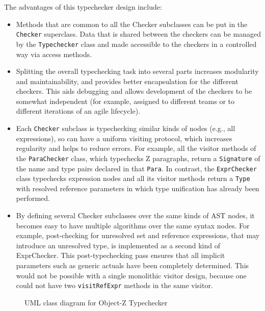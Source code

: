 \documentclass{llncs}
\begin{document}
The advantages of this typechecker design include:
\begin{itemize}

\item Methods that are common to all the Checker subclasses can be put in
  the \texttt{Checker} superclass.  Data that is shared between the checkers
  can be managed by the \texttt{Typechecker} class and made accessible
  to the checkers in a controlled way via access methods.

\item Splitting the overall typechecking task into several parts increases
  modularity and maintainability, and provides better encapsulation
  for the different checkers.  This aids debugging and allows development
  of the checkers to be somewhat independent (for example, assigned to
  different teams or to different iterations of an agile lifecycle).

\item Each \texttt{Checker} subclass is typechecking similar kinds of
  nodes (e.g., all expressions), so can have a uniform visiting
  protocol, which increases regularity and helps to reduce errors.
  For example, all the visitor methods of the
  \texttt{ParaChecker} class, which typechecks Z paragraphs, return a
  \texttt{Signature} of the name and type pairs declared in that
  \texttt{Para}.  In contrast, the \texttt{ExprChecker} class
  typechecks expression nodes and all its visitor methods return a
  \texttt{Type} with resolved reference parameters in which type
  unification has already been performed.

\item By defining several Checker subclasses over the same kinds of
  AST nodes, it becomes easy to have multiple algorithms over the same
  syntax nodes.  For example, post-checking for unresolved set and
  reference expressions, that may introduce an unresolved type, is
  implemented as a second kind of ExprChecker. This post-typechecking
  pass ensures that all implicit parameters such as generic actuals
  have been completely determined.  This would not be possible with a
  single monolithic visitor design, because one could not have two
  \texttt{visitRefExpr} methods in the same visitor.

\end{itemize}


\def\epsfsize#1#2{0.50#1}
\begin{figure}[t]
\begin{center}
\caption{UML class diagram for Object-Z Typechecker}\label{fig:oztypechecker}
\end{center}
\end{figure}
\def\epsfsize#1#2{\epsfxsize}
\end{document}
